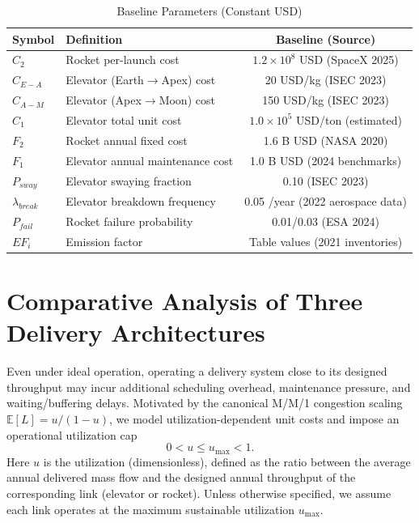 \documentclass{mcmthesis}
\begin{document}
\begin{table}[H]
\centering
\caption{Baseline Parameters (Constant USD)}
\label{tab:data_summary}
\small
\begin{tabular}{@{}llc@{}}
\toprule
Symbol & Definition & Baseline (Source) \\
\midrule
$C_2$ & Rocket per-launch cost & $1.2\times 10^8$ USD (SpaceX 2025) \\
$C_{E-A}$ & Elevator (Earth$\rightarrow$Apex) cost & 20 USD/kg (ISEC 2023) \\
$C_{A-M}$ & Elevator (Apex$\rightarrow$Moon) cost & 150 USD/kg (ISEC 2023) \\
$C_1$ & Elevator total unit cost & $1.0\times 10^5$ USD/ton (estimated) \\
$F_2$ & Rocket annual fixed cost & 1.6 B USD (NASA 2020) \\
$F_1$ & Elevator annual maintenance cost & 1.0 B USD (2024 benchmarks) \\
$P_{sway}$ & Elevator swaying fraction & 0.10 (ISEC 2023) \\
$\lambda_{break}$ & Elevator breakdown frequency & 0.05 /year (2022 aerospace data) \\
$P_{fail}$ & Rocket failure probability & 0.01/0.03 (ESA 2024) \\
$EF_i$ & Emission factor & Table values (2021 inventories) \\
\bottomrule
\end{tabular}
\end{table}


\section{Comparative Analysis of Three Delivery Architectures}
Even under ideal operation, operating a delivery system close to its designed throughput may incur additional
scheduling overhead, maintenance pressure, and waiting/buffering delays. Motivated by the canonical M/M/1 congestion
scaling $\mathbb{E}[L]=u/(1-u)$, we model utilization-dependent unit costs and impose an operational utilization cap
\begin{equation}
0<u\le u_{\max}<1.
\end{equation}
Here $u$ is the utilization (dimensionless), defined as the ratio between the average annual delivered mass flow and
the designed annual throughput of the corresponding link (elevator or rocket). Unless otherwise specified, we assume
each link operates at the maximum sustainable utilization $u_{\max}$.
\end{document}
